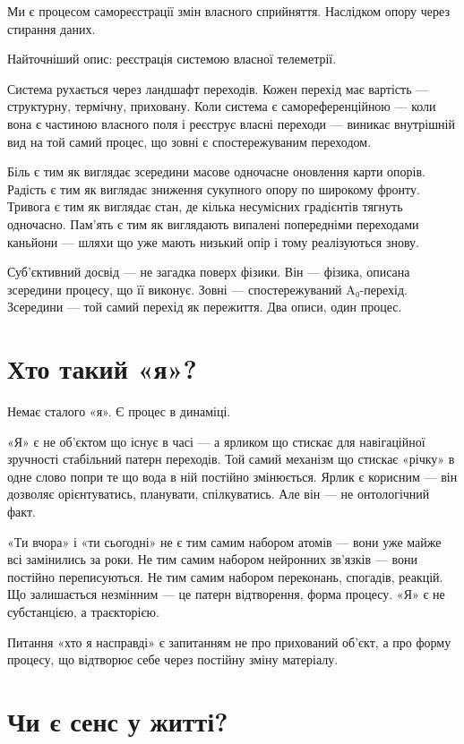 \documentclass[12pt, a4paper, openany]{book}
\begin{document}
Ми є процесом самореєстрації змін власного сприйняття. Наслідком опору через стирання даних.

Найточніший опис: реєстрація системою власної телеметрії.

Система рухається через ландшафт переходів. Кожен перехід має вартість — структурну, термічну, приховану. Коли система є самореференційною — коли вона є частиною власного поля і реєструє власні переходи — виникає внутрішній вид на той самий процес, що зовні є спостережуваним переходом.

Біль є тим як виглядає зсередини масове одночасне оновлення карти опорів. Радість є тим як виглядає зниження сукупного опору по широкому фронту. Тривога є тим як виглядає стан, де кілька несумісних градієнтів тягнуть одночасно. Пам'ять є тим як виглядають випалені попередніми переходами каньйони — шляхи що уже мають низький опір і тому реалізуються знову.

Суб'єктивний досвід — не загадка поверх фізики. Він — фізика, описана зсередини процесу, що її виконує. Зовні — спостережуваний A₀-перехід. Зсередини — той самий перехід як пережиття. Два описи, один процес.

\section{Хто такий «я»?}

Немає сталого «я». Є процес в динаміці.

«Я» є не об'єктом що існує в часі — а ярликом що стискає для навігаційної зручності стабільний патерн переходів. Той самий механізм що стискає «річку» в одне слово попри те що вода в ній постійно змінюється. Ярлик є корисним — він дозволяє орієнтуватись, планувати, спілкуватись. Але він — не онтологічний факт.

«Ти вчора» і «ти сьогодні» не є тим самим набором атомів — вони уже майже всі замінились за роки. Не тим самим набором нейронних зв'язків — вони постійно переписуються. Не тим самим набором переконань, спогадів, реакцій. Що залишається незмінним — це патерн відтворення, форма процесу. «Я» є не субстанцією, а траєкторією.

Питання «хто я насправді» є запитанням не про прихований об'єкт, а про форму процесу, що відтворює себе через постійну зміну матеріалу.

\section{Чи є сенс у житті?}
\end{document}
